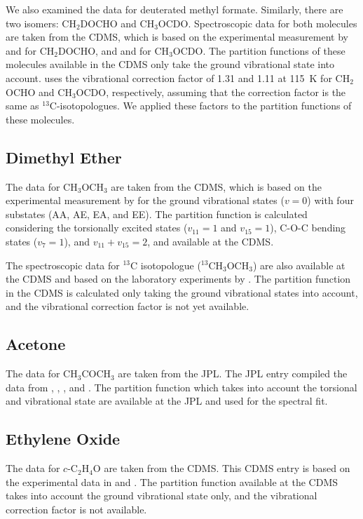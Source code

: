 \documentclass[linenumbers, twocolumn, twocolappendix, astrosymb, times]{aastex631}
\newcommand{\dimethylether}{CH$_3$OCH$_3$\xspace}
\newcommand{\acetone}{CH$_3$COCH$_3$\xspace}
\newcommand{\ethyleneoxide}{$c$-C$_2$H$_4$O\xspace}
\begin{document}
We also examined the data for deuterated methyl formate. Similarly, there are two isomers: CH$_2$DOCHO and CH$_3$OCDO. Spectroscopic data for both molecules are taken from the CDMS, which is based on the experimental measurement by \citet{Coudert2013} and \citet{Margules2009} for CH$_2$DOCHO, and \citet{Margules2010} and \citet{Duan2015} for CH$_3$OCDO. The partition functions of these molecules available in the CDMS only take the ground vibrational state into account. 
\citet{Manigand2019} uses the vibrational correction factor of 1.31 and 1.11 at 115~K for CH$_2$OCHO and CH$_3$OCDO, respectively, assuming that the correction factor is the same as $^{13}$C-isotopologues. We applied these factors to the partition functions of these molecules.


\subsection{Dimethyl Ether}
The data for \dimethylether are taken from the CDMS, which is based on the experimental measurement by \citet{Endres2009} for the ground vibrational states ($v = 0$) with four substates (AA, AE, EA, and EE). The partition function is calculated considering the torsionally excited states ($v_{11} = 1$ and $v_{15} = 1$), C-O-C bending states ($v_7 = 1$), and $v_{11} + v_{15} = 2$, and available at the CDMS. 

The spectroscopic data for $^{13}$C isotopologue ($^{13}$\dimethylether) are also available at the CDMS and based on the laboratory experiments by \citet{Koerber2013}. The partition function in the CDMS is calculated only taking the ground vibrational states into account, and the vibrational correction factor is not yet available.   

\subsection{Acetone}
The data for \acetone are taken from the JPL. The JPL entry compiled the data from \citet{Peter1965}, \citet{Vacherand1986}, \citet{Oldag1992}, and \citet{Groder2002}. The partition function which takes into account the torsional and vibrational state are available at the JPL and used for the spectral fit. 

\subsection{Ethylene Oxide}
The data for \ethyleneoxide are taken from the CDMS. This CDMS entry is based on the experimental data in \citet{Creswell1974} and \citet{Muller2022}. The partition function available at the CDMS takes into account the ground vibrational state only, and the vibrational correction factor is not available.
\end{document}
